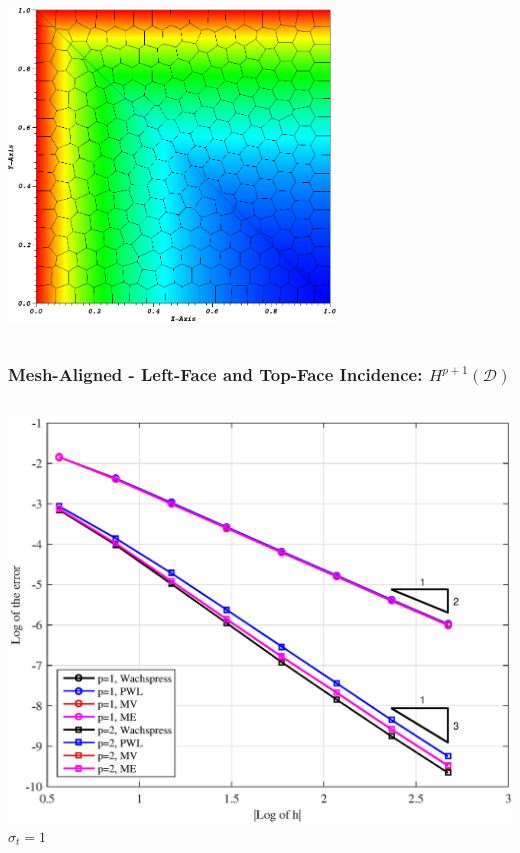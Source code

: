 \documentclass[compress,10pt]{beamer}
\begin{document}
\begin{frame}[t]
{\begin{columns}
{}\includegraphics[width=0.65\textwidth]{images/PALeftTopSol_SplitPoly.png}
\end{columns}
}
{
\frametitle{Mesh-Aligned - Left-Face and Top-Face Incidence: $H^{p+1} (\mathcal{D})$}
\vspace{1.00cm}
\begin{columns}[c]
\centering
{}\includegraphics[width=\textwidth]{images/PAErr_LeftTop_SplitPoly_sig1.eps} \\
$\sigma_t = 1$
\centering

\end{columns}}
\end{frame}
\end{document}
